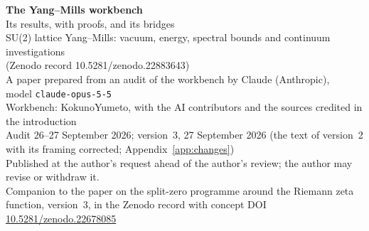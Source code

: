 


\thispagestyle{plain}
\begin{center}
{\LARGE\bfseries The Yang--Mills workbench}\\[8pt]
{\Large Its results, with proofs, and its bridges}\\[6pt]
{\large SU(2) lattice Yang--Mills: vacuum, energy, spectral bounds and continuum investigations\\ (Zenodo record 10.5281/zenodo.22883643)}\\[14pt]
{\large A paper prepared from an audit of the workbench by Claude (Anthropic),\\ model \texttt{claude-opus-5-5}}\\[8pt]
{\normalsize Workbench: KokunoYumeto, with the AI contributors and the sources credited in the introduction}\\[4pt]
{\normalsize Audit 26--27 September 2026; version~3, 27 September 2026 (the text of version~2 with its framing corrected; Appendix~\ref{app:changes})}\\[4pt]
{\small Published at the author's request ahead of the author's review; the author may revise or withdraw it.}\\[2pt]
{\small Companion to the paper on the split-zero programme around the Riemann zeta function, version~3, in the Zenodo record with concept DOI \href{https://doi.org/10.5281/zenodo.22678085}{10.5281/zenodo.22678085}}
\end{center}



\tableofcontents
\clearpage











\appendix





